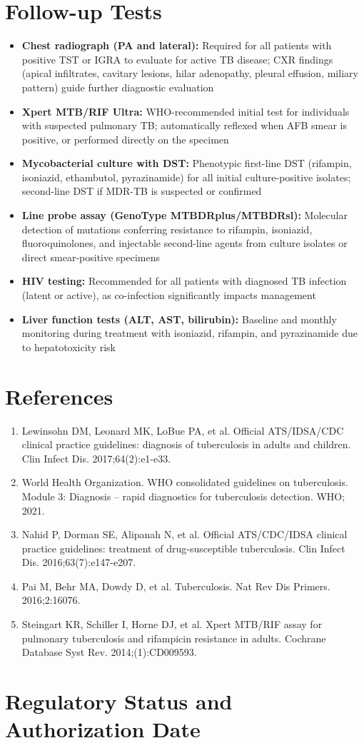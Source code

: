 \section*{Follow-up Tests}
\begin{itemize}
  \item \textbf{Chest radiograph (PA and lateral):} Required for all patients with positive TST or IGRA to evaluate for active TB disease; CXR findings (apical infiltrates, cavitary lesions, hilar adenopathy, pleural effusion, miliary pattern) guide further diagnostic evaluation
  \item \textbf{Xpert MTB/RIF Ultra:} WHO-recommended initial test for individuals with suspected pulmonary TB; automatically reflexed when AFB smear is positive, or performed directly on the specimen
  \item \textbf{Mycobacterial culture with DST:} Phenotypic first-line DST (rifampin, isoniazid, ethambutol, pyrazinamide) for all initial culture-positive isolates; second-line DST if MDR-TB is suspected or confirmed
  \item \textbf{Line probe assay (GenoType MTBDRplus/MTBDRsl):} Molecular detection of mutations conferring resistance to rifampin, isoniazid, fluoroquinolones, and injectable second-line agents from culture isolates or direct smear-positive specimens
  \item \textbf{HIV testing:} Recommended for all patients with diagnosed TB infection (latent or active), as co-infection significantly impacts management
  \item \textbf{Liver function tests (ALT, AST, bilirubin):} Baseline and monthly monitoring during treatment with isoniazid, rifampin, and pyrazinamide due to hepatotoxicity risk
\end{itemize}

\section*{References}
\begin{enumerate}
  \item Lewinsohn DM, Leonard MK, LoBue PA, et al. Official ATS/IDSA/CDC clinical practice guidelines: diagnosis of tuberculosis in adults and children. Clin Infect Dis. 2017;64(2):e1-e33.
  \item World Health Organization. WHO consolidated guidelines on tuberculosis. Module 3: Diagnosis -- rapid diagnostics for tuberculosis detection. WHO; 2021.
  \item Nahid P, Dorman SE, Alipanah N, et al. Official ATS/CDC/IDSA clinical practice guidelines: treatment of drug-susceptible tuberculosis. Clin Infect Dis. 2016;63(7):e147-e207.
  \item Pai M, Behr MA, Dowdy D, et al. Tuberculosis. Nat Rev Dis Primers. 2016;2:16076.
  \item Steingart KR, Schiller I, Horne DJ, et al. Xpert MTB/RIF assay for pulmonary tuberculosis and rifampicin resistance in adults. Cochrane Database Syst Rev. 2014;(1):CD009593.
\end{enumerate}

\clearpage
\section*{Regulatory Status and Authorization Date}

\clearpage

